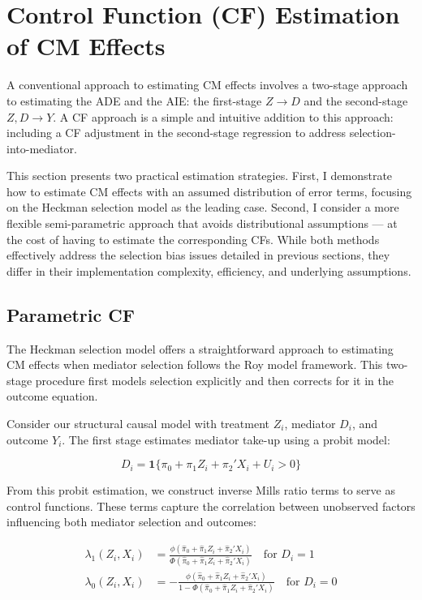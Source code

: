 \section{Control Function (CF) Estimation of CM Effects}
\label{sec:controlfun}
A conventional approach to estimating CM effects involves a two-stage approach to estimating the ADE and the AIE: the first-stage $Z \to D$ and the second-stage $Z, D \to Y$.
A CF approach is a simple and intuitive addition to this approach: including a CF adjustment in the second-stage regression to address selection-into-mediator. 

This section presents two practical estimation strategies.
First, I demonstrate how to estimate CM effects with an assumed distribution of error terms, focusing on the Heckman selection model as the leading case.
Second, I consider a more flexible semi-parametric approach that avoids distributional assumptions --- at the cost of having to estimate the corresponding CFs.
While both methods effectively address the selection bias issues detailed in previous sections, they differ in their implementation complexity, efficiency, and underlying assumptions.

\subsection{Parametric CF}
The Heckman selection model offers a straightforward approach to estimating CM effects when mediator selection follows the Roy model framework. This two-stage procedure first models selection explicitly and then corrects for it in the outcome equation.

Consider our structural causal model with treatment $Z_i$, mediator $D_i$, and outcome $Y_i$. The first stage estimates mediator take-up using a probit model:

\begin{equation}
D_i = \mathbf{1}\{\pi_0 + \pi_1 Z_i + \pi_2' X_i + U_i > 0\}
\end{equation}

From this probit estimation, we construct inverse Mills ratio terms to serve as control functions. These terms capture the correlation between unobserved factors influencing both mediator selection and outcomes:

\begin{align}
\lambda_1(Z_i,X_i) &= \frac{\phi(\hat{\pi}_0 + \hat{\pi}_1 Z_i + \hat{\pi}_2' X_i)}{\Phi(\hat{\pi}_0 + \hat{\pi}_1 Z_i + \hat{\pi}_2' X_i)} \quad \text{for } D_i = 1 \\
\lambda_0(Z_i,X_i) &= -\frac{\phi(\hat{\pi}_0 + \hat{\pi}_1 Z_i + \hat{\pi}_2' X_i)}{1-\Phi(\hat{\pi}_0 + \hat{\pi}_1 Z_i + \hat{\pi}_2' X_i)} \quad \text{for } D_i = 0
\end{align}

